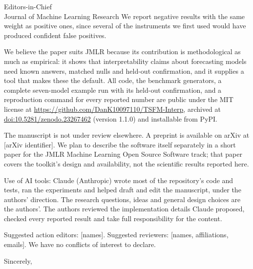 \documentclass[11pt]{letter}
\begin{document}
\begin{letter}{Editors-in-Chief\\Journal of Machine Learning Research}
We report negative results with the same weight as positive ones, since several of the instruments we first used
would have produced confident false positives.

We believe the paper suits JMLR because its contribution is methodological as much as empirical: it shows that
interpretability claims about forecasting models need known answers, matched nulls and held-out
confirmation, and it supplies a tool that makes these the default. All code, the benchmark generators, a complete
seven-model example run with its held-out confirmation, and a reproduction command for every reported number are
public under the MIT license at \url{https://github.com/DanK10097110/TSFM-Interp}, archived at
\href{https://doi.org/10.5281/zenodo.23267462}{doi:10.5281/zenodo.23267462} (version 1.1.0) and installable from PyPI.

The manuscript is not under review elsewhere. A preprint is available on arXiv at [arXiv identifier]. We plan to
describe the software itself separately in a short paper for the JMLR Machine Learning Open Source Software track; that
paper covers the toolkit's design and availability, not the scientific results reported here.

Use of AI tools: Claude (Anthropic) wrote most of the repository's code and tests, ran the experiments and helped draft
and edit the manuscript, under the authors' direction. The research questions, ideas and general design choices are
the authors'. The authors reviewed the implementation details Claude proposed, checked every reported result and take
full responsibility for the content.

Suggested action editors: [names]. Suggested reviewers: [names, affiliations, emails]. We have no conflicts of
interest to declare.

\closing{Sincerely,}

\end{letter}
\end{document}
